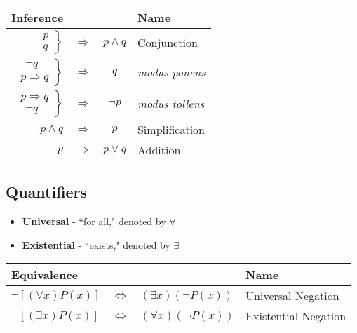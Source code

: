 \documentclass{article}
\begin{document}
\begin{itemize}
            \begin{table}[htb]
                \begin{tabular}{rcc|l}
                    \textbf{Inference} & & & \textbf{Name} \\
                    \hline \hline
                    $\left.\begin{array}{l}
                    p \\
                    q
                    \end{array}\right\}$ & $\Rightarrow$ & $p \land q$ & Conjunction \\
                    \hline
                    $\left.\begin{array}{l}
                    \ \ \neg q \\
                    p \Rightarrow q
                    \end{array}\right\}$ & $\Rightarrow$ & $q$ & \textit{modus ponens} \\
                    \hline
                    $\left.\begin{array}{l}
                    p \Rightarrow q \\
                    \ \ \neg q 
                    \end{array}\right\}$ & $\Rightarrow$ & $\neg p$ & \textit{modus tollens} \\
                    \hline
                    $p \land q$ & $\Rightarrow$ & $p$ & Simplification \\
                    \hline
                    $p$ & $\Rightarrow$ & $p \lor q$ & Addition \\
                \end{tabular}
            \end{table}
            \end{itemize}

        \subsection{Quantifiers}
        \begin{itemize}
            \item \textbf{Universal }- ``for all," denoted by $\forall$
            \item \textbf{Existential }- ``exists," denoted by $\exists$
        \end{itemize}

        \begin{tabular}{lcl|l}
             \textbf{Equivalence} &&& \textbf{Name} \\
             \hline \hline
             $\neg [(\forall x)P(x)]$ & $\iff$ & $(\exists x)(\neg P(x))$ & Universal Negation \\
             \hline
             $\neg [(\exists x)P(x)]$ & $\iff$ & $(\forall x)(\neg P(x))$ & Existential Negation \\
        \end{tabular}
\end{document}
